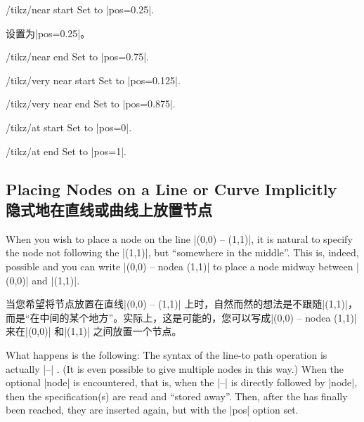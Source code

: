 \begin{stylekey}{/tikz/near start}
    Set to |pos=0.25|.

    设置为|pos=0.25|。
\end{stylekey}

\begin{stylekey}{/tikz/near end}
    Set to |pos=0.75|.
\end{stylekey}

\begin{stylekey}{/tikz/very near start}
    Set to |pos=0.125|.
\end{stylekey}

\begin{stylekey}{/tikz/very near end}
    Set to |pos=0.875|.
\end{stylekey}

\begin{stylekey}{/tikz/at start}
    Set to |pos=0|.
\end{stylekey}

\begin{stylekey}{/tikz/at end}
    Set to |pos=1|.
\end{stylekey}


\subsection{Placing Nodes on a Line or Curve Implicitly\\隐式地在直线或曲线上放置节点}
\label{section-nodes-placing-2}

When you wish to place a node on the line |(0,0) -- (1,1)|, it is natural to
specify the node not following the |(1,1)|, but ``somewhere in the middle''.
This is, indeed, possible and you can write |(0,0) -- node{a} (1,1)| to place a
node midway between |(0,0)| and |(1,1)|.

当您希望将节点放置在直线|(0,0) -- (1,1)| 上时，自然而然的想法是不跟随|(1,1)|，而是“在中间的某个地方”。实际上，这是可能的，您可以写成|(0,0) -- node{a} (1,1)| 来在|(0,0)| 和|(1,1)| 之间放置一个节点。

What happens is the following: The syntax of the line-to path operation is
actually |--| . (It is
even possible to give multiple nodes in this way.) When the optional |node| is
encountered, that is, when the |--| is directly followed by |node|, then the
specification(s) are read and ``stored away''. Then, after the
 has finally been reached, they are inserted again, but with
the |pos| option set.

